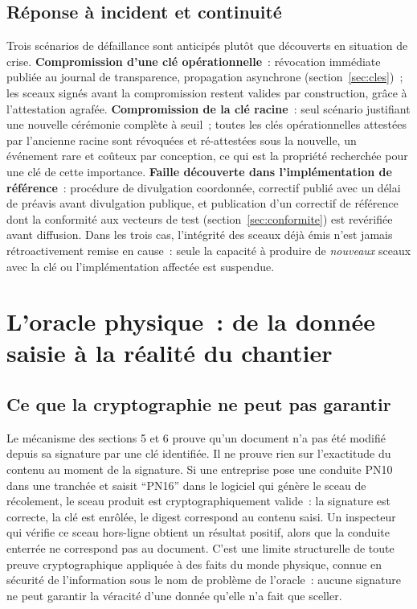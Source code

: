 \documentclass[11pt,a4paper]{article}
\begin{document}
\subsection{Réponse à incident et continuité}\label{sec:incident}

Trois scénarios de défaillance sont anticipés plutôt que découverts en situation de crise. \textbf{Compromission d'une clé opérationnelle}~: révocation immédiate publiée au journal de transparence, propagation asynchrone (section~\ref{sec:cles})~; les sceaux signés avant la compromission restent valides par construction, grâce à l'attestation agrafée. \textbf{Compromission de la clé racine}~: seul scénario justifiant une nouvelle cérémonie complète à seuil~; toutes les clés opérationnelles attestées par l'ancienne racine sont révoquées et ré-attestées sous la nouvelle, un événement rare et coûteux par conception, ce qui est la propriété recherchée pour une clé de cette importance. \textbf{Faille découverte dans l'implémentation de référence}~: procédure de divulgation coordonnée, correctif publié avec un délai de préavis avant divulgation publique, et publication d'un correctif de référence dont la conformité aux vecteurs de test (section~\ref{sec:conformite}) est revérifiée avant diffusion. Dans les trois cas, l'intégrité des sceaux déjà émis n'est jamais rétroactivement remise en cause~: seule la capacité à produire de \emph{nouveaux} sceaux avec la clé ou l'implémentation affectée est suspendue.

\section{L'oracle physique~: de la donnée saisie à la réalité du chantier}\label{sec:oracle}

\subsection{Ce que la cryptographie ne peut pas garantir}

Le mécanisme des sections 5 et 6 prouve qu'un document n'a pas été modifié depuis sa signature par une clé identifiée. Il ne prouve rien sur l'exactitude du contenu au moment de la signature. Si une entreprise pose une conduite PN10 dans une tranchée et saisit \enquote{PN16} dans le logiciel qui génère le sceau de récolement, le sceau produit est cryptographiquement valide~: la signature est correcte, la clé est enrôlée, le digest correspond au contenu saisi. Un inspecteur qui vérifie ce sceau hors-ligne obtient un résultat positif, alors que la conduite enterrée ne correspond pas au document. C'est une limite structurelle de toute preuve cryptographique appliquée à des faits du monde physique, connue en sécurité de l'information sous le nom de problème de l'oracle~: aucune signature ne peut garantir la véracité d'une donnée qu'elle n'a fait que sceller.
\end{document}
